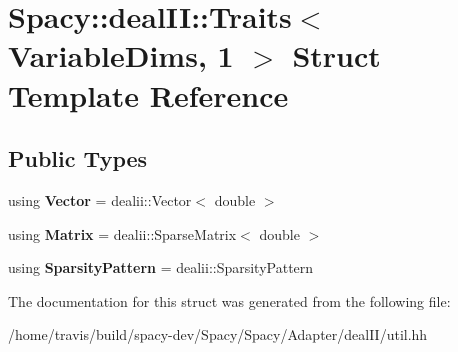 \hypertarget{structSpacy_1_1dealII_1_1Traits_3_01VariableDims_00_011_01_4}{\section{Spacy\-:\-:deal\-I\-I\-:\-:Traits$<$ Variable\-Dims, 1 $>$ Struct Template Reference}
\label{structSpacy_1_1dealII_1_1Traits_3_01VariableDims_00_011_01_4}
}
\subsection*{Public Types}
\begin{DoxyCompactItemize}
\item 
\hypertarget{structSpacy_1_1dealII_1_1Traits_3_01VariableDims_00_011_01_4_acf95a2a23af77750025fa970a023823f}{using {\bfseries Vector} = dealii\-::\-Vector$<$ double $>$}\label{structSpacy_1_1dealII_1_1Traits_3_01VariableDims_00_011_01_4_acf95a2a23af77750025fa970a023823f}

\item 
\hypertarget{structSpacy_1_1dealII_1_1Traits_3_01VariableDims_00_011_01_4_a330692554e9744d080d3d3596cdc6140}{using {\bfseries Matrix} = dealii\-::\-Sparse\-Matrix$<$ double $>$}\label{structSpacy_1_1dealII_1_1Traits_3_01VariableDims_00_011_01_4_a330692554e9744d080d3d3596cdc6140}

\item 
\hypertarget{structSpacy_1_1dealII_1_1Traits_3_01VariableDims_00_011_01_4_a728acb846b1e826d6cd25099b369e48f}{using {\bfseries Sparsity\-Pattern} = dealii\-::\-Sparsity\-Pattern}\label{structSpacy_1_1dealII_1_1Traits_3_01VariableDims_00_011_01_4_a728acb846b1e826d6cd25099b369e48f}

\end{DoxyCompactItemize}


The documentation for this struct was generated from the following file\-:\begin{DoxyCompactItemize}
\item 
/home/travis/build/spacy-\/dev/\-Spacy/\-Spacy/\-Adapter/deal\-I\-I/util.\-hh\end{DoxyCompactItemize}
